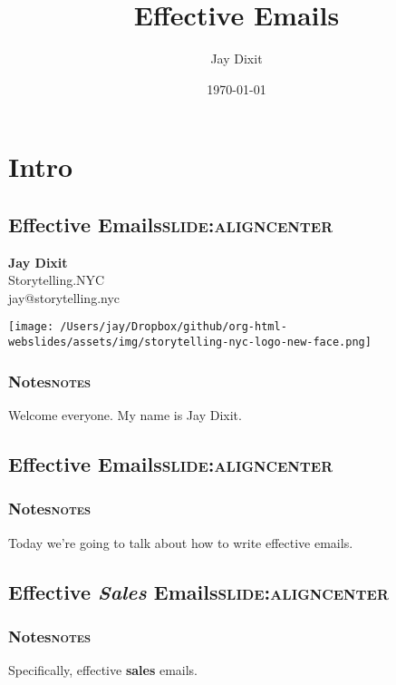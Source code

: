 \documentclass[11pt]{article}
\author{Jay Dixit}
\date{\today}
\title{Effective Emails}
\begin{document}
\maketitle
\tableofcontents
\newpage




\section{Intro}
\label{sec:org144a7af}


\subsection{Effective Emails\hfill{}\textsc{slide:aligncenter}}
\label{sec:org678f0c2}

\textbf{Jay Dixit} \\
Storytelling.NYC \\
jay@storytelling.nyc \\

\begin{center}
\texttt{[image: /Users/jay/Dropbox/github/org-html-webslides/assets/img/storytelling-nyc-logo-new-face.png]}
\end{center}

\subsubsection{Notes\hfill{}\textsc{notes}}
\label{sec:org3b67233}
Welcome everyone. My name is Jay Dixit.

\subsection{Effective Emails\hfill{}\textsc{slide:aligncenter}}
\label{sec:org285f70f}
\subsubsection{Notes\hfill{}\textsc{notes}}
\label{sec:org1431dea}
Today we're going to talk about how to write effective emails.

\subsection{Effective \textit{Sales} Emails\hfill{}\textsc{slide:aligncenter}}
\label{sec:orgd126313}

\subsubsection{Notes\hfill{}\textsc{notes}}
\label{sec:org44b4ede}
Specifically, effective \textbf{sales} emails.
\end{document}
